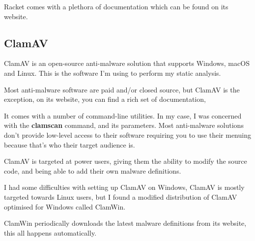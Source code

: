 Racket comes with a plethora of documentation which can be found on its website.

\subsection{ClamAV}
ClamAV is an open-source anti-malware solution that
supports Windows, macOS and Linux. \cite{clamav}
This is the software I'm using to perform my static analysis.

Most anti-malware software are paid and/or closed source,
but ClamAV is the exception, on its website, you can find a rich set of documentation,

It comes with a number of command-line utilities.
In my case, I was concerned with the \textbf{clamscan} command, and its parameters.
Most anti-malware solutions don't provide low-level access to their software
requiring you to use their menuing because that's who their target audience is.

ClamAV is targeted at power users,
giving them the ability to modify the source code,
and being able to add their own malware definitions.

I had some difficulties with setting up ClamAV on Windows,
ClamAV is mostly targeted towards Linux users,
but I found a modified distribution of ClamAV optimised for Windows
called ClamWin.

ClamWin periodically downloads the latest malware
definitions from its website,
this all happens automatically.
